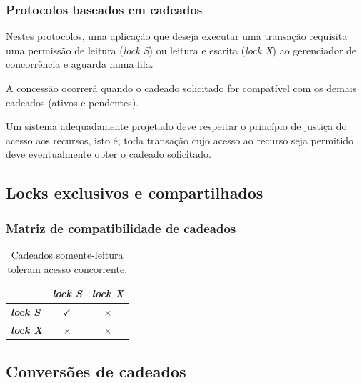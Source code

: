 \documentclass{beamer}
\begin{document}
\begin{frame} %
    \frametitle{Protocolos baseados em cadeados}

    Nestes protocolos, uma aplicação que deseja executar uma transação requisita uma permissão de leitura (\emph{lock S}) ou leitura e escrita (\emph{lock X}) ao gerenciador de concorrência e aguarda numa fila.

    \medskip
        
    A concessão ocorrerá quando o cadeado solicitado for compatível com os demais cadeados (ativos e pendentes).

    \medskip

    Um sistema adequadamente projetado deve respeitar o princípio de justiça do acesso aos recursos, isto é, toda transação cujo acesso ao recurso seja permitido deve eventualmente obter o cadeado solicitado. 
\end{frame}


\subsection{Locks exclusivos e compartilhados}

\begin{frame} %
    \frametitle{Matriz de compatibilidade de cadeados}
    
    \begin{table}
    \begin{tabular}{l c c}
        \toprule

        \textbf{} & \textbf{\emph{lock S}} & \textbf{\emph{lock X}}\\

        \midrule

        \textbf{\emph{lock S}} & $\checkmark$ & $\times$ \\
        \textbf{\emph{lock X}} & $\times$ & $\times$ \\

        \bottomrule
    \end{tabular}
    \caption{Cadeados somente-leitura toleram acesso concorrente.}
    \end{table}
\end{frame}


\subsection{Conversões de cadeados} %
\end{document}
